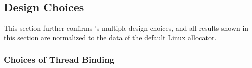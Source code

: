 
 

\subsection{Design Choices}
\label{sec:design}

This section further confirms \NM{}'s multiple design choices, and all results shown in this section are normalized to the data of the default Linux allocator.  

\subsubsection{Choices of Thread Binding}
\label{sec: threadbinding}


